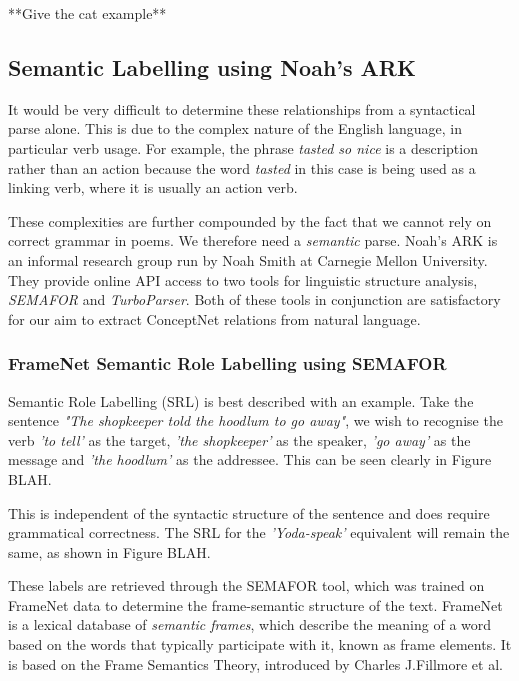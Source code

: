 **Give the cat example**

\subsection{Semantic Labelling using Noah's ARK}

It would be very difficult to determine these relationships from a syntactical parse alone. This is due to the complex nature of the English language, in particular verb usage. For example, the phrase \textit{tasted so nice} is a description rather than an action because the word \textit{tasted} in this case is being used as a linking verb, where it is usually an action verb.

These complexities are further compounded by the fact that we cannot rely on correct grammar in poems. We therefore need a \textit{semantic} parse. Noah's ARK is an informal research group run by Noah Smith at Carnegie Mellon University. They provide online API access to two tools for linguistic structure analysis, \textit{SEMAFOR} and \textit{TurboParser}. Both of these tools in conjunction are satisfactory for our aim to extract ConceptNet relations from natural language.

\subsubsection{FrameNet Semantic Role Labelling using SEMAFOR}
\label{sec:sema}

Semantic Role Labelling (SRL) is best described with an example. Take the sentence \textit{"The shopkeeper told the hoodlum to go away"}, we wish to recognise the verb \textit{'to tell'} as the target, \textit{'the shopkeeper'} as the speaker, \textit{'go away'} as the message and \textit{'the hoodlum'} as the addressee. This can be seen clearly in Figure BLAH. 

This is independent of the syntactic structure of the sentence and does require grammatical correctness. The SRL for the \textit{'Yoda-speak'} equivalent will remain the same, as shown in Figure BLAH.

These labels are retrieved through the SEMAFOR tool, which was trained on FrameNet data to determine the frame-semantic structure of the text. FrameNet is a lexical database of \textit{semantic frames}, which describe the meaning of a word based on the words that typically participate with it, known as frame elements. It is based on the Frame Semantics Theory, introduced by Charles J.Fillmore et al.

